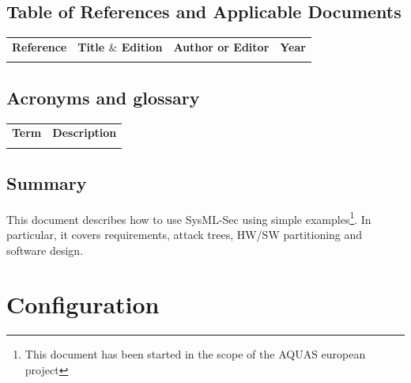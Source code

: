 \documentclass[12pt]{article}
\begin{document}
\subsection{Table of References and Applicable Documents}

\begin{table}[H]
\large
\centering
\begin{adjustbox}{width=\textwidth}
\begin{tabular}{ |p{2.66in}|p{2.66in}|p{0.95in}|p{0.43in}| }
\hhline{----}
\textbf{Reference} & \textbf{Title  $  \&  $  Edition} & \textbf{Author or
Editor} & \textbf{Year}
\\
\hhline{----}
 &  &  &  \\ 
\hline
\end{tabular}
\end{adjustbox}
\end{table}

\subsection{Acronyms and glossary}

\begin{table}[H]
\large
\centering
\begin{adjustbox}{width=\textwidth}
\begin{tabular}{ |p{1.24in}|p{5.45in}| }
\hhline{--}
\textbf{Term} & \textbf{Description} \\ 
\hhline{--}
 &  \\ 
\hline
\end{tabular}
\end{adjustbox}
\end{table}

\subsection{Summary}

This document describes how to use SysML-Sec using simple examples\footnote{This document has been started in the scope of the AQUAS european project}. In particular, it covers requirements, attack trees, HW/SW partitioning and software design.

\newpage

\section{Configuration}\label{sec:conf}
\end{document}
